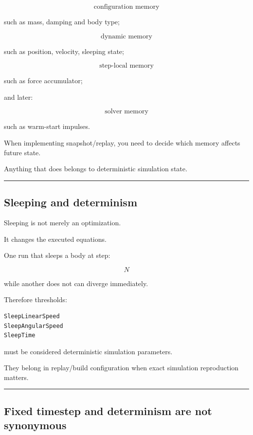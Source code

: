 \[
\boxed{
\text{configuration memory}
}
\]

such as mass, damping and body type;

\[
\boxed{
\text{dynamic memory}
}
\]

such as position, velocity, sleeping state;

\[
\boxed{
\text{step-local memory}
}
\]

such as force accumulator;

and later:

\[
\boxed{
\text{solver memory}
}
\]

such as warm-start impulses.

When implementing snapshot/replay, you need to decide which memory affects future state.

Anything that does belongs to deterministic simulation state.

\begin{center}\rule{0.5\linewidth}{0.5pt}\end{center}

\subsection{Sleeping and determinism}\label{06-engine-ii-ch037-sleeping-and-determinism}

Sleeping is not merely an optimization.

It changes the executed equations.

One run that sleeps a body at step:

\[
N
\]

while another does not can diverge immediately.

Therefore thresholds:

\begin{verbatim}
SleepLinearSpeed
SleepAngularSpeed
SleepTime
\end{verbatim}

must be considered deterministic simulation parameters.

They belong in replay/build configuration when exact simulation reproduction matters.

\begin{center}\rule{0.5\linewidth}{0.5pt}\end{center}

\subsection{Fixed timestep and determinism are not synonymous}\label{06-engine-ii-ch037-fixed-timestep-and-determinism-are-not-synonymous}

